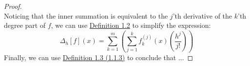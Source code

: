 \begin{proof}
\begin{equation}
  \end{equation}
  Noticing that the inner summation is equivalent to the $j$'th derivative of the $k$'th degree part of $f$, we can use \hyperref[def:ordered-part-definition]{Definition 1.2} to simplify the expression:
  \begin{equation}
    \label{eq:fdo-simplification-8}
    \Delta_{h}\left[f\right]\left(x\right)=\sum_{k=1}^{m}\left(\sum_{j=1}^{k}f^{\left(j\right)}_k\left(x\right)\left(\frac{h^j}{j!}\right)\right)
  \end{equation}
  Finally, we can use \hyperref[eq:ordered-part-definition-3]{Definition 1.3 (1.1.3)} to conclude that ...
\end{proof}